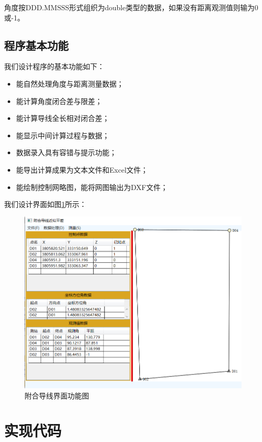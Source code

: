 角度按DDD.MMSSS形式组织为double类型的数据，如果没有距离观测值则输为0或-1。

\subsection{程序基本功能}

我们设计程序的基本功能如下：
\begin{itemize}
\item 能自然处理角度与距离测量数据；
\item  能计算角度闭合差与限差；
\item  能计算导线全长相对闭合差；
\item  能显示中间计算过程与数据；
\item  数据录入具有容错与提示功能；
\item  能导出计算成果为文本文件和Excel文件；
\item  能绘制控制网略图，能将网图输出为DXF文件；
\end{itemize}

我们设计界面如图\ref{fig:ctUI01}所示：

\begin{figure}[htbp]
	\centering
	\includegraphics[scale=0.8]{connectingtraverse/ctUI01.png}
	\caption{附合导线界面功能图}
	\label{fig:ctUI01}
\end{figure}

\section{实现代码}

